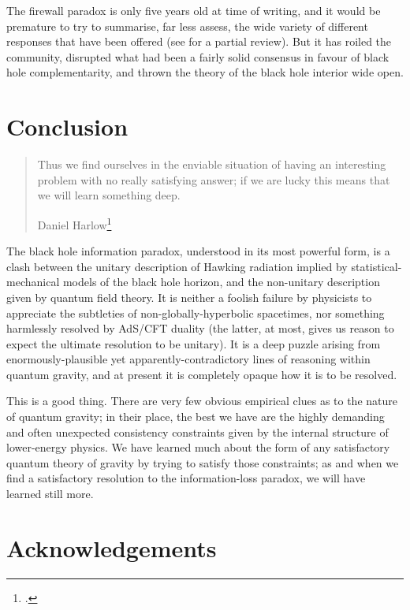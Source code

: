 \documentclass[12pt]{article}
\begin{document}
The firewall paradox is only five years old at time of writing, and it would be premature to try to summarise, far less assess, the wide variety of different responses that have been offered (see  for a partial review). But it has roiled the community, disrupted what had been a fairly solid consensus in favour of black hole complementarity, and thrown the theory of the black hole interior wide open.

\section{Conclusion}\label{conclusion}

\begin{quote}
Thus we find ourselves in the enviable situation of having an interesting problem with no really satisfying answer; if we are lucky this means that we will learn something deep.

\begin{flushright}
Daniel Harlow\footnote{.}
\end{flushright}
\end{quote}

The black hole information paradox, understood in its most powerful form, is a clash between the unitary description of Hawking radiation implied by statistical-mechanical models of the black hole horizon, and the non-unitary description given by quantum field theory. It is neither a foolish failure by physicists to appreciate the subtleties of non-globally-hyperbolic spacetimes, nor something harmlessly resolved by AdS/CFT duality (the latter, at most, gives us reason to expect the ultimate resolution to be unitary). It is a deep puzzle arising from enormously-plausible yet apparently-contradictory lines of reasoning within quantum gravity, and at present it is completely opaque how it is to be resolved.

This is a good thing. There are very few obvious empirical clues as to the nature of quantum gravity; in their place, the best we have are the highly demanding and often unexpected consistency constraints given by the internal structure of lower-energy physics. We have learned much about the form of any satisfactory quantum theory of gravity by trying to satisfy those constraints; as and when we find a satisfactory resolution to the information-loss paradox, we will have learned still more.

\section*{Acknowledgements}
\end{document}

